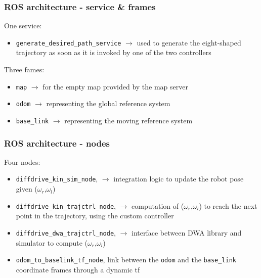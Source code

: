 \documentclass{beamer}
\begin{document}

\begin{frame}
\frametitle{ROS architecture - service \& frames}

One service:
\begin{itemize}
  \item \texttt{generate\_desired\_path\_service} $\rightarrow$ used to generate the eight-shaped trajectory as soon as it is invoked by one of the two controllers
\end{itemize}

\vspace{2em}

Three fames:
\begin{itemize}
  \item \texttt{map} $\rightarrow$ for the empty map provided by the map server
  \item \texttt{odom} $\rightarrow$ representing the global reference system
  \item \texttt{base\_link} $\rightarrow$ representing the moving reference system
\end{itemize}

\end{frame}


\begin{frame}
\frametitle{ROS architecture - nodes}

Four nodes:
\begin{itemize}
  \item \texttt{diffdrive\_kin\_sim\_node}, $\rightarrow$ integration logic to update the robot pose given ($\omega_r$,$\omega_l$)
  \item \texttt{diffdrive\_kin\_trajctrl\_node}, $\rightarrow$ computation of ($\omega_r$,$\omega_l$) to reach the next point in the trajectory, using the custom controller
  \item \texttt{diffdrive\_dwa\_trajctrl\_node}, $\rightarrow$ interface between DWA library and simulator to compute ($\omega_r$,$\omega_l$)
  \item \texttt{odom\_to\_baselink\_tf\_node}, link between the \texttt{odom} and the \texttt{base\_link} coordinate frames through a dynamic tf
\end{itemize}

\end{frame}
\end{document}
